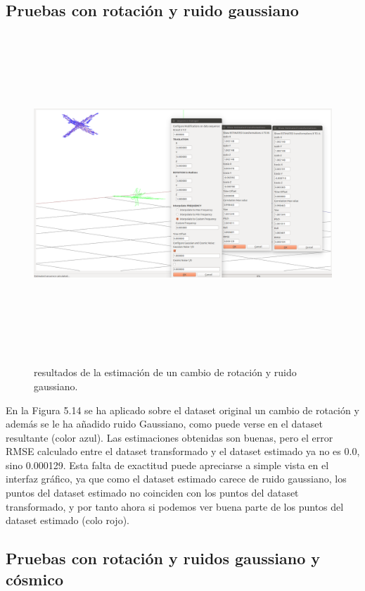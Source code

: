 \subsection{Pruebas con rotación y ruido gaussiano}
\begin{figure}[h]
\begin{center}
\label{fig:opciones de View}\includegraphics[height=12.0cm,width=18.0cm]{img/cap6/Rota_GaussNoise_abba.png}
\hspace{0.5cm}

\end{center}

\caption{ resultados de la estimación de un cambio de rotación y ruido gaussiano.}
\end{figure}
En la Figura 5.14 se ha aplicado sobre el dataset original un cambio de rotación y además se le ha añadido ruido Gaussiano, como puede verse en el dataset resultante (color azul). Las estimaciones obtenidas son buenas, pero el error RMSE calculado entre el dataset transformado y el dataset estimado ya no es 0.0, sino 0.000129. Esta falta de exactitud puede apreciarse a simple vista en el interfaz gráfico, ya que como el dataset estimado carece de ruido gaussiano, los puntos del dataset estimado no coinciden con los puntos del dataset transformado, y por tanto ahora si podemos ver buena parte de los puntos del dataset estimado (colo rojo).


\subsection{Pruebas con rotación y ruidos gaussiano y cósmico}

